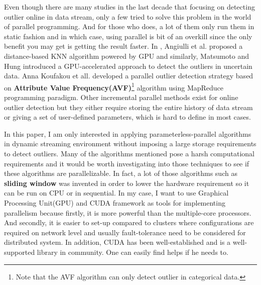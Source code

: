 \documentclass[11pt]{article}       %
\begin{document}
Even though there are many studies in the last decade that focusing on detecting outlier online in data stream, only a few tried to solve this problem in the world of parallel programming. And for those who does, a lot of them only run them in static fashion and in which case, using parallel is bit of an overkill since the only benefit you may get is getting the result faster. In \cite{6641405},  Angiulli et al. proposed a distance-based KNN algorithm powered by GPU and similarly, Matsumoto and Hung\cite{Matsumoto2012} introduced a GPU-accelerated approach to detect the outliers in uncertain data. Anna Koufakou et all.\cite{4634266} developed a parallel outlier detection strategy based on \textbf{Attribute Value Frequency(AVF)}\cite{4410382}\footnote{Note that the AVF algorithm can only detect outlier in categorical data.} algorithm using MapReduce programming paradigm. Other incremental parallel methods exist for online outlier detection but they either require storing the entire history of data stream or giving a set of user-defined parameters, which is hard to define in most cases. 

In this paper, I am only interested in applying parameterless-parallel algorithms in dynamic streaming environment without imposing a large storage requirements to detect outliers. Many of the algorithms mentioned pose a harsh computational requirements and it would be worth investigating into those techniques to see if these algorithms are parallelizable. In fact, a lot of those algorithms such as \textbf{sliding window} was invented in order to lower the hardware requirement so it can be run on CPU or in sequential. In my case, I want to use Graphical Processing Unit(GPU) and CUDA framework as tools for implementing parallelism because firstly, it is more powerful than the multiple-core processors. And secondly, it is easier to set-up compared to clusters where configurations are required on network level and usually fault-tolerance need to be considered for distributed system. In addition, CUDA has been well-established and is a well-supported library in community. One can easily find helps if he needs to.




\end{document}
